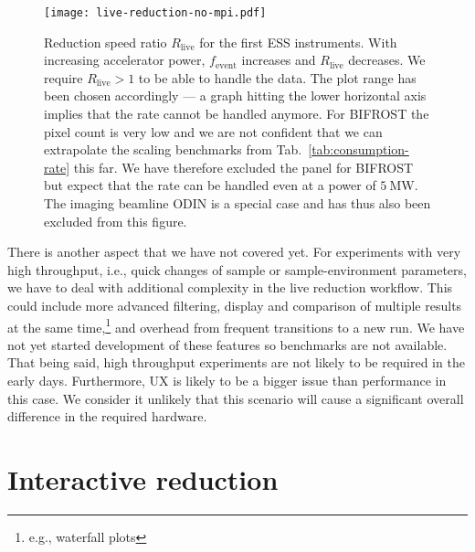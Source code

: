 \documentclass[a4paper,english,numbers=noenddot,bibliography=totoc,chapterprefix=on,DIV=12]{scrartcl}
\newcommand{\Fevent}{f_{\text{event}}}
\newcommand{\bifrost}{BIFROST\xspace}
\newcommand{\odin}{ODIN\xspace}
\begin{document}
\begin{figure}
  \centering
\texttt{[image: live-reduction-no-mpi.pdf]}
\caption{\label{fig:live-reduction-no-mpi}Reduction speed ratio $R_{\text{live}}$ for the first ESS instruments.
With increasing accelerator power, $\Fevent$ increases and $R_{\text{live}}$ decreases.
We require $R_{\text{live}} > 1$ to be able to handle the data.
The plot range has been chosen accordingly --- a graph hitting the lower horizontal axis implies that the rate cannot be handled anymore.
For \bifrost the pixel count is very low and we are not confident that we can extrapolate the scaling benchmarks from Tab.~\ref{tab:consumption-rate} this far.
We have therefore excluded the panel for \bifrost but expect that the rate can be handled even at a power of $5~\mathrm{MW}$.
The imaging beamline \odin is a special case and has thus also been excluded from this figure.
}
\end{figure}

There is another aspect that we have not covered yet.
For experiments with very high throughput, i.e., quick changes of sample or sample-environment parameters, we have to deal with additional complexity in the live reduction workflow.
This could include more advanced filtering, display and comparison of multiple results at the same time,\footnote{e.g., waterfall plots} and overhead from frequent transitions to a new run.
We have not yet started development of these features so benchmarks are not available.
That being said, high throughput experiments are not likely to be required in the early days.
Furthermore, UX is likely to be a bigger issue than performance in this case.
We consider it unlikely that this scenario will cause a significant overall difference in the required hardware.

\section{Interactive reduction}
\end{document}
